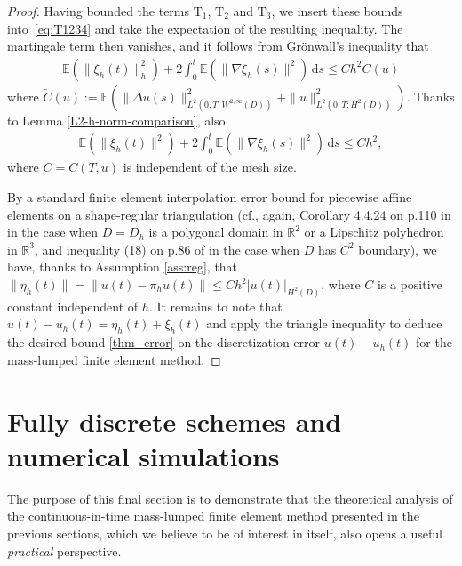 \documentclass[12pt]{article}
\newcommand{\dd}{\,\mathrm{d}}
\begin{document}
{\begin{proof}
Having bounded the terms $\mathrm{T}_1$, $\mathrm{T}_2$ and  $\mathrm{T}_3$, we insert these bounds into~\eqref{eq:T1234} and take the expectation of the resulting inequality. The martingale term then vanishes, and it follows from Gr\"onwall's inequality that
%
\begin{align*}
   \mathbb{E}(\|\xi_h(t)\|^2_h) + 2 \int_0^t \mathbb{E}(\| \nabla \xi_h(s)\|^2) \dd s \leq 
   C h^2 \tilde{C}(u)
\end{align*}
where $\tilde{C}(u) := \mathbb{E}
   \left(\|\Delta u(s)\|_{L^2(0,T;W^{2,\infty}(D))}^2 + \|u\|^2_{L^2(0,T:H^2(D))} \right)$.
%
Thanks to Lemma \ref{L2-h-norm-comparison}, also
%
\begin{align*}
   \mathbb{E}(\|\xi_h(t)\|^2) + 2 \int_0^t \mathbb{E}(\| \nabla \xi_h(s)\|^2) \dd s \leq C h^2, 
\end{align*}
where $C=C(T,u)$ is independent of the mesh size.

\smallskip

By a standard finite element interpolation error bound for piecewise affine elements on a shape-regular triangulation (cf., again, Corollary 4.4.24 on p.110 in \cite{MR2373954} in the case when $D=D_h$ is a polygonal domain in $\mathbb{R}^2$ or a Lipschitz polyhedron in $\mathbb{R}^3$, and inequality (18) on p.86 of  \cite{MR584442} in the case when $D$ has $C^2$ boundary), we have, thanks to Assumption \ref{ass:reg}, that $\|\eta_h(t)\| = \|u(t) - \pi_h u(t) \| \leq C h^2|u(t)|_{H^2(D)}$, where $C$ is a positive constant independent of $h$.  It remains to note that $u(t)-u_h(t) = \eta_h(t) + \xi_h(t)$ and apply the triangle inequality to deduce the desired bound \eqref{thm_error} on the discretization error $u(t)-u_h(t)$ for the mass-lumped finite element method.
\end{proof}

\section{Fully discrete schemes and numerical simulations}
\label{Section:NumericalExperiments}

The purpose of this final section is to demonstrate that the theoretical analysis of the continuous-in-time mass-lumped finite element method presented in the previous sections, which we believe to be of interest in itself, also opens a useful \emph{practical} perspective. 

}
\end{document}
